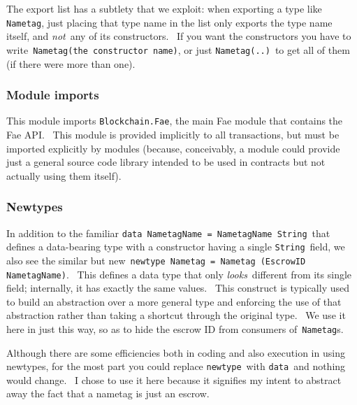 \documentclass[11pt]{article}
\begin{document}

\vspace{11pt}

The export list has a subtlety that we exploit: when exporting a type like \texttt{Nametag}, just placing that type name in the list only exports the type name itself, and \textit{not} any of its constructors.  If you want the constructors you have to write \texttt{Nametag(the constructor name)}, or just \texttt{Nametag(..)} to get all of them (if there were more than one).

\subsubsection{Module imports}
\vspace{5.5pt}

This module imports \texttt{Blockchain.Fae}, the main Fae module that contains the Fae API.  This module is provided implicitly to all transactions, but must be imported explicitly by modules (because, conceivably, a module could provide just a general source code library intended to be used in contracts but not actually using them itself).

\subsubsection{Newtypes}
\vspace{5.5pt}

In addition to the familiar \texttt{data NametagName = NametagName String} that defines a data-bearing type with a constructor having a single \texttt{String} field, we also see the similar but new \texttt{newtype Nametag = Nametag (EscrowID NametagName)}.  This defines a data type that only \textit{looks} different from its single field; internally, it has exactly the same values.  This construct is typically used to build an abstraction over a more general type and enforcing the use of that abstraction rather than taking a shortcut through the original type.  We use it here in just this way, so as to hide the escrow ID from consumers of \texttt{Nametag}s.


\vspace{11pt}

Although there are some efficiencies both in coding and also execution in using newtypes, for the most part you could replace \texttt{newtype} with \texttt{data} and nothing would change.  I chose to use it here because it signifies my intent to abstract away the fact that a nametag is just an escrow.
\end{document}

